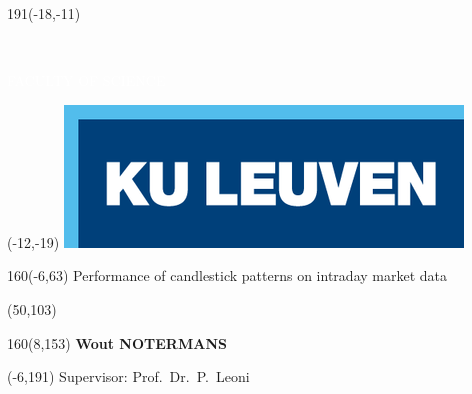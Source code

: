 \thispagestyle{empty}
\newcommand{\form}[1]{\scalebox{1.087}{\boldmath{#1}}}
\sffamily
%
\begin{textblock}{191}(-18,-11)
  \colorbox{bluetitle}{\hspace{139mm}\ \parbox[c][18truemm]{52mm}{\textcolor{white}{FACULTY OF SCIENCE}}}
\end{textblock}
%
\begin{textblock}{70}(-12,-19)
  \textblockcolour{}
  \includegraphics*[height=19.8truemm]{Images/LogoKULeuven}
\end{textblock}
%
\begin{textblock}{160}(-6,63)
  \textblockcolour{}
  \vspace{-\parskip}
  \flushleft
  \fontsize{40}{42}\selectfont \textcolor{bluetitle}{Performance of candlestick patterns on intraday market data}\\[1.5mm]
\end{textblock}
%
\begin{textblock}{82}(50,103)
  \textblockcolour{}
  \vspace{-\parskip}
  \flushleft
\end{textblock}
%
\begin{textblock}{160}(8,153)
  \textblockcolour{}
  \vspace{-\parskip}
  \flushright
  \fontsize{14}{16}\selectfont \textbf{Wout NOTERMANS}
\end{textblock}
%
\begin{textblock}{70}(-6,191)
  \textblockcolour{}
  \vspace{-\parskip}
  \flushleft
  Supervisor: Prof.~Dr.~P.~Leoni\\[-2pt]
\end{textblock}
